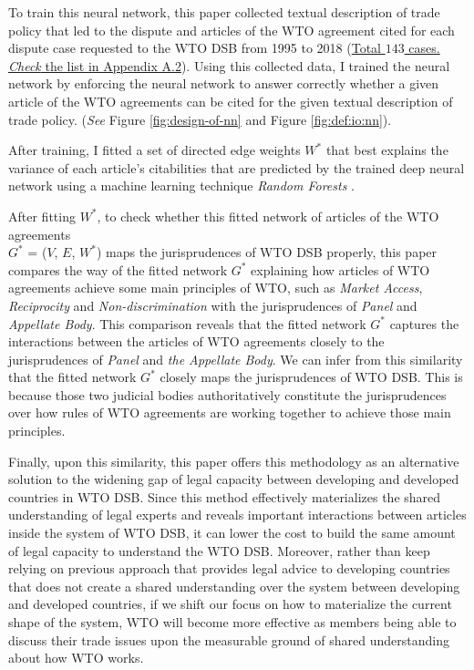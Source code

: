  
To train this neural network, this paper collected textual description of trade policy
that led to the dispute and articles of the WTO agreement cited for each dispute
case requested to the WTO DSB
from 1995 to 2018 (\hyperref[sub:cited-articles-table]{Total $143$ cases. \textit{Check} the list in Appendix A.2}).
Using this collected data, I trained the neural network by enforcing the neural network to answer correctly
whether a given article of the WTO agreements
can be cited for the given textual description of
trade policy. (\textit{See} Figure \ref{fig:design-of-nn} and Figure \ref{fig:def:io:nn}).
 
After training, I fitted a set of directed edge weights $W^*$ that
best explains the variance of each article's citabilities that are predicted by the trained deep neural network using a machine learning technique \textit{Random Forests} \citep{rf, genie3}.
 
After fitting $W^*$, to check whether this fitted network of articles of the WTO agreements\\  $G^*$ = ($V$, $E$, $W^*$) maps the jurisprudences of WTO DSB properly, this paper
compares the way of the fitted network $G^*$ explaining how articles of WTO agreements achieve some main principles of WTO, such as \textit{Market Access}, \textit{Reciprocity} and \textit{Non-discrimination}
with the jurisprudences of \textit{Panel} and \textit{Appellate Body}. This comparison reveals that the fitted network $G^*$ captures the interactions between the articles of WTO agreements
closely to the jurisprudences of \textit{Panel} and \textit{the Appellate Body}. We can infer from this similarity that the fitted network $G^*$ closely maps the jurisprudences of WTO DSB. This is because those two judicial bodies
authoritatively constitute the jurisprudences over how rules of WTO agreements are working together
to achieve those main principles.
 
Finally, upon this similarity, this paper offers this methodology as
an alternative solution to the widening gap of legal capacity between developing and developed countries in WTO DSB.
Since this method effectively materializes the shared understanding of legal experts and reveals important interactions between articles inside the system of WTO DSB,
it can lower the cost to build the same amount of legal capacity to understand the WTO DSB.
Moreover, rather than keep relying on previous approach that provides legal advice to developing countries that does not create a shared understanding over the system between developing and developed countries,
if we shift our focus on how to materialize the current shape of the system, WTO
will become more effective as members being able to discuss their trade issues upon the measurable ground of shared understanding about how WTO works.
 
 
 

